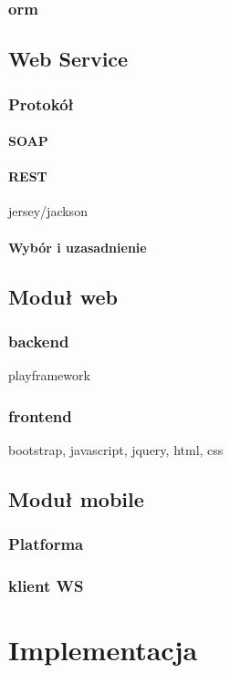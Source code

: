 \documentclass[11pt]{aghdpl}
\begin{document}
\subsection{orm}
\section{Web Service}
\subsection{Protokół}
\subsubsection{SOAP}
\subsubsection{REST}
jersey/jackson
\subsubsection{Wybór i uzasadnienie}
\subsection{}
\section{Moduł web}
\subsection{backend}
playframework
\subsection{frontend}
bootstrap, javascript, jquery, html, css
\section{Moduł mobile}
\subsection{Platforma}
\subsection{klient WS}


\chapter{Implementacja}
\end{document}
